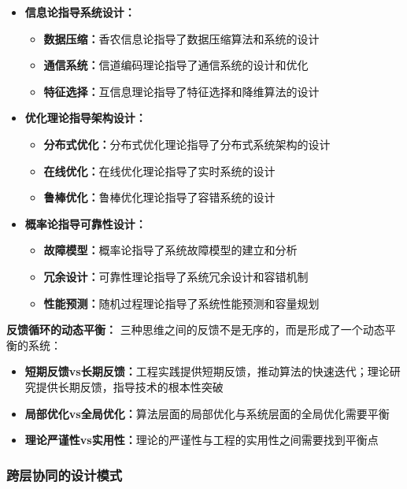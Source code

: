 \begin{itemize}
\item \textbf{信息论指导系统设计：}
\begin{itemize}
\item \textbf{数据压缩：}香农信息论指导了数据压缩算法和系统的设计
\item \textbf{通信系统：}信道编码理论指导了通信系统的设计和优化
\item \textbf{特征选择：}互信息理论指导了特征选择和降维算法的设计
\end{itemize}

\item \textbf{优化理论指导架构设计：}
\begin{itemize}
\item \textbf{分布式优化：}分布式优化理论指导了分布式系统架构的设计
\item \textbf{在线优化：}在线优化理论指导了实时系统的设计
\item \textbf{鲁棒优化：}鲁棒优化理论指导了容错系统的设计
\end{itemize}

\item \textbf{概率论指导可靠性设计：}
\begin{itemize}
\item \textbf{故障模型：}概率论指导了系统故障模型的建立和分析
\item \textbf{冗余设计：}可靠性理论指导了系统冗余设计和容错机制
\item \textbf{性能预测：}随机过程理论指导了系统性能预测和容量规划
\end{itemize}
\end{itemize}

\textbf{反馈循环的动态平衡：}
三种思维之间的反馈不是无序的，而是形成了一个动态平衡的系统：

\begin{itemize}
\item \textbf{短期反馈vs长期反馈：}工程实践提供短期反馈，推动算法的快速迭代；理论研究提供长期反馈，指导技术的根本性突破
\item \textbf{局部优化vs全局优化：}算法层面的局部优化与系统层面的全局优化需要平衡
\item \textbf{理论严谨性vs实用性：}理论的严谨性与工程的实用性之间需要找到平衡点
\end{itemize}

\subsubsection{跨层协同的设计模式}

